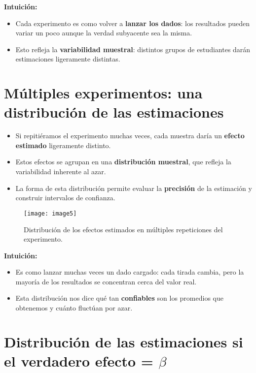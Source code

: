 \documentclass[12pt]{article}
\begin{document}
\textbf{Intuición:}
\begin{itemize}
    \item Cada experimento es como volver a \textbf{lanzar los dados}: los resultados pueden variar un poco aunque la verdad subyacente sea la misma.
    \item Esto refleja la \textbf{variabilidad muestral}: distintos grupos de estudiantes darán estimaciones ligeramente distintas.
\end{itemize}

\section*{\noindent\textbf{Múltiples experimentos: una distribución de las estimaciones}}

\begin{itemize}
    \item Si repitiéramos el experimento muchas veces, cada muestra daría un \textbf{efecto estimado} ligeramente distinto.
    \item Estos efectos se agrupan en una \textbf{distribución muestral}, que refleja la variabilidad inherente al azar.
    \item La forma de esta distribución permite evaluar la \textbf{precisión} de la estimación y construir intervalos de confianza.
\end{itemize}

\begin{figure}[H]
\centering
\texttt{[image: image5]}
\caption{\footnotesize Distribución de los efectos estimados en múltiples repeticiones del experimento.}
\end{figure}

\textbf{Intuición:}
\begin{itemize}
    \item Es como lanzar muchas veces un dado cargado: cada tirada cambia, pero la mayoría de los resultados se concentran cerca del valor real.
    \item Esta distribución nos dice qué tan \textbf{confiables} son los promedios que obtenemos y cuánto fluctúan por azar.
\end{itemize}

\section*{\noindent\textbf{Distribución de las estimaciones si el verdadero efecto = $\beta$}}
\end{document}
